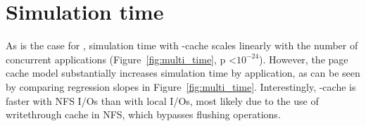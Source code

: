 \section{Simulation time}

As is the case for \wrench, simulation time with \wrench-cache scales
linearly with the number of concurrent applications
(Figure~\ref{fig:multi_time}, p \textless $10^{-24}$). However, the page
cache model substantially increases simulation time by
application, as can be seen by comparing regression slopes in
Figure~\ref{fig:multi_time}. Interestingly, \wrench-cache is faster with 
NFS I/Os than with local I/Os, most likely due to the use of writethrough
cache in NFS, which bypasses flushing operations.